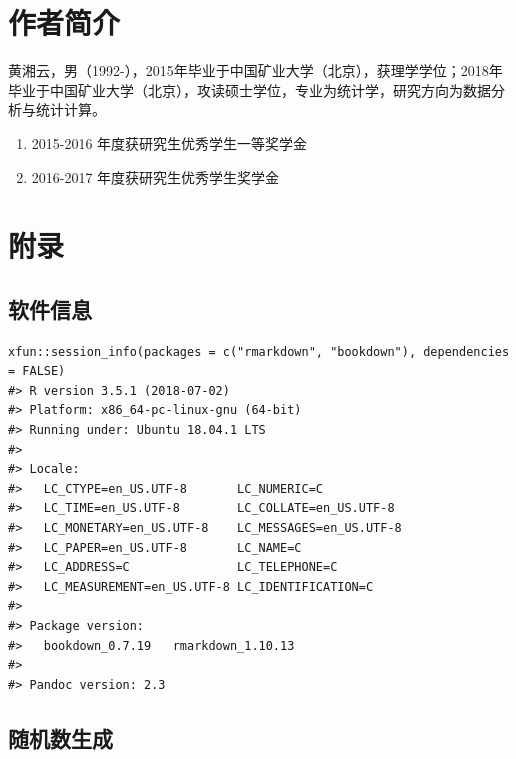 \documentclass[12pt,a4paper,UTF8,twoside]{book}
\providecommand{\tightlist}{%
  \setlength{\itemsep}{0pt}\setlength{\parskip}{0pt}}
\theoremstyle{definition}
\theoremstyle{definition}
\theoremstyle{definition}
\theoremstyle{remark}
\begin{document}
\hypertarget{author}{%
\chapter*{作者简介}\label{author}}


黄湘云，男（1992-），2015年毕业于中国矿业大学（北京），获理学学位；2018年毕业于中国矿业大学（北京），攻读硕士学位，专业为统计学，研究方向为数据分析与统计计算。

\begin{center} \kaishu {}\end{center}

\begin{enumerate}
\def\labelenumi{\arabic{enumi}.}
\tightlist
\item
  2015-2016 年度获研究生优秀学生一等奖学金
\item
  2016-2017 年度获研究生优秀学生奖学金
\end{enumerate}

\hypertarget{appendix}{%
\chapter*{附录}\label{appendix}}


\hypertarget{sessioninfo}{%
\section*{软件信息}\label{sessioninfo}}

\begin{verbatim}
xfun::session_info(packages = c("rmarkdown", "bookdown"), dependencies = FALSE)
#> R version 3.5.1 (2018-07-02)
#> Platform: x86_64-pc-linux-gnu (64-bit)
#> Running under: Ubuntu 18.04.1 LTS
#> 
#> Locale:
#>   LC_CTYPE=en_US.UTF-8       LC_NUMERIC=C              
#>   LC_TIME=en_US.UTF-8        LC_COLLATE=en_US.UTF-8    
#>   LC_MONETARY=en_US.UTF-8    LC_MESSAGES=en_US.UTF-8   
#>   LC_PAPER=en_US.UTF-8       LC_NAME=C                 
#>   LC_ADDRESS=C               LC_TELEPHONE=C            
#>   LC_MEASUREMENT=en_US.UTF-8 LC_IDENTIFICATION=C       
#> 
#> Package version:
#>   bookdown_0.7.19   rmarkdown_1.10.13
#> 
#> Pandoc version: 2.3
\end{verbatim}

\hypertarget{random-number-generation}{%
\section*{随机数生成}\label{random-number-generation}}
\end{document}
